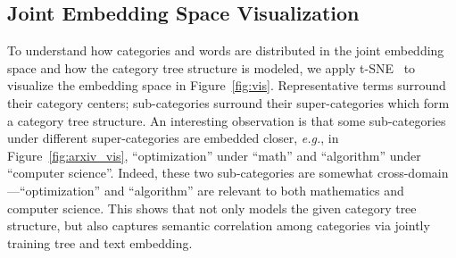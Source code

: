 \documentclass[sigconf]{acmart}
\newcommand{\eg}{\emph{e.g.}}
\theoremstyle{definition}
\begin{document}
\begin{table}[t]
\centering
\caption{Quantitative evaluation: Weakly-supervised hierarchical classification.}
\vspace*{-1em}
\label{tab:class_results}
\vspace*{-1em}
\end{table}

\subsection{Joint Embedding Space Visualization}
\begin{figure*}[t]
\centering
{}
\vspace{-1em}
\caption{Joint embedding space visualization. Category center vectors are denoted as stars; representative words are denoted as dots in the same color with corresponding category.}
\label{fig:vis}
\vspace{-1em}
\end{figure*}
To understand how categories and words are distributed in the joint embedding space and how the category tree structure is modeled, we apply t-SNE~\cite{Maaten2008VisualizingDU} to visualize the embedding space in Figure~\ref{fig:vis}. Representative terms surround their category centers; sub-categories surround their super-categories which form a category tree structure. An interesting observation is that some sub-categories under different super-categories are embedded closer, \eg, in Figure~\ref{fig:arxiv_vis}, ``optimization'' under ``math'' and ``algorithm'' under ``computer science''. Indeed, these two sub-categories are somewhat cross-domain---``optimization'' and ``algorithm'' are relevant to both mathematics and computer science. This shows that \josh
not only models the given category tree structure, but also captures semantic correlation among categories via jointly training tree and text embedding.
\end{document}
